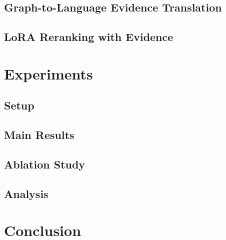 \documentclass[10pt,twocolumn]{article}
\begin{document}
\subsection{Graph-to-Language Evidence Translation}

\subsection{LoRA Reranking with Evidence}

\section{Experiments}

\subsection{Setup}

\subsection{Main Results}

\subsection{Ablation Study}

\subsection{Analysis}

\section{Conclusion}

\end{document}
